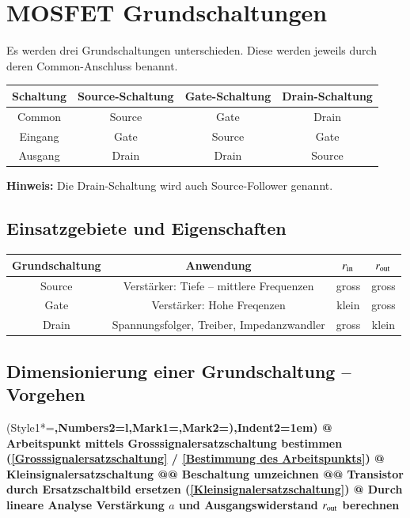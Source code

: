 \section{MOSFET Grundschaltungen}
Es werden drei Grundschaltungen unterschieden. 
Diese werden jeweils durch deren Common-Anschluss benannt.

\begin{center}
    \begingroup{}
    \begin{tabular}{|c|ccc|}
        \hline
        Schaltung   & Source-Schaltung & Gate-Schaltung & Drain-Schaltung \\
        \hline
        Common      & Source    & Gate      & Drain     \\
        Eingang     & Gate      & Source    & Gate      \\
        Ausgang     & Drain     & Drain     & Source    \\
        \hline
    \end{tabular}\endgroup
\end{center}

\textbf{Hinweis:} Die Drain-Schaltung wird auch Source-Follower genannt.


\subsection{Einsatzgebiete und Eigenschaften}

\begin{center}
    \begingroup{}
    \begin{tabular}{|c|ccc|}
        \hline
        Grundschaltung  & Anwendung                                 & $r_{\rm in}$  & $r_{\rm out}$ \\
        \hline
        Source          & Verstärker: Tiefe -- mittlere Frequenzen  & gross         & gross         \\
        Gate            & Verstärker: Hohe Freqenzen                & klein         & gross         \\
        Drain           & Spannungsfolger, Treiber, Impedanzwandler & gross         & klein         \\
        \hline
    \end{tabular}\endgroup
\end{center}

\subsection{Dimensionierung einer Grundschaltung -- Vorgehen}
\begin{easylist}
    \ListProperties(Style1*=\bfseries,Numbers2=l,Mark1={},Mark2={)},Indent2=1em)
    @ Arbeitspunkt mittels Grosssignalersatzschaltung bestimmen (\ref{Grosssignalersatzschaltung} / \ref{Bestimmung des Arbeitspunkts})
    @ Kleinsignalersatzschaltung 
    @@ Beschaltung umzeichnen
    @@ Transistor durch Ersatzschaltbild ersetzen (\ref{Kleinsignalersatzschaltung})
    @ Durch lineare Analyse Verstärkung $a$ und Ausgangswiderstand $r_{\rm out}$ berechnen
\end{easylist}

